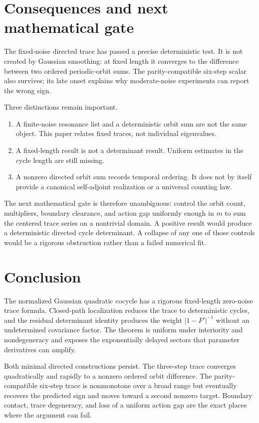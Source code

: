 \documentclass[11pt]{article}
\theoremstyle{remark}
\begin{document}
\section{Consequences and next mathematical gate}
\label{sec:consequences}

The fixed-noise directed trace has passed a precise deterministic test.  It is
not created by Gaussian smoothing: at fixed length it converges to the
difference between two ordered periodic-orbit sums.  The parity-compatible
six-step scalar also survives; its late onset explains why moderate-noise
experiments can report the wrong sign.

Three distinctions remain important.
\begin{enumerate}[label=(\roman*),leftmargin=2.2em]
 \item A finite-noise resonance list and a deterministic orbit sum are not the
 same object.  This paper relates fixed traces, not individual eigenvalues.
 \item A fixed-length result is not a determinant result.  Uniform estimates
 in the cycle length are still missing.
 \item A nonzero directed orbit sum records temporal ordering.  It does not by
 itself provide a canonical self-adjoint realization or a universal counting
 law.
\end{enumerate}

The next mathematical gate is therefore unambiguous: control the orbit count,
multipliers, boundary clearance, and action gap uniformly enough in $m$ to
sum the centered trace series on a nontrivial domain.  A positive result would
produce a deterministic directed cycle determinant.  A collapse of any one of
those controls would be a rigorous obstruction rather than a failed numerical
fit.

\section{Conclusion}

The normalized Gaussian quadratic cocycle has a rigorous fixed-length
zero-noise trace formula.  Closed-path localization reduces the trace to
deterministic cycles, and the residual determinant identity produces the
weight $|1-F'|^{-1}$ without an undetermined covariance factor.  The theorem
is uniform under interiority and nondegeneracy and exposes the exponentially
delayed sectors that parameter derivatives can amplify.

Both minimal directed constructions persist.  The three-step trace converges
quadratically and rapidly to a nonzero ordered orbit difference.  The
parity-compatible six-step trace is nonmonotone over a broad range but
eventually recovers the predicted sign and moves toward a second nonzero
target.  Boundary contact, trace degeneracy, and loss of a uniform action gap
are the exact places where the argument can fail.
\end{document}
